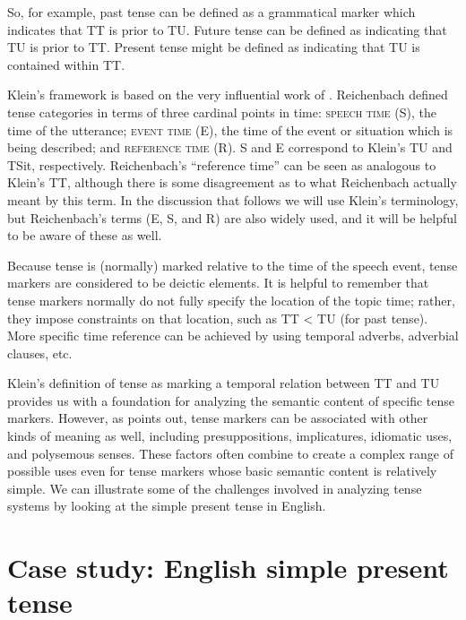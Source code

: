So, for example, past tense can be defined as a grammatical marker which indicates that TT is prior to TU. Future tense can be defined as indicating that TU is prior to TT. Present tense might be defined as indicating that TU is contained within TT.



Klein’s framework is based on the very influential work of \citet{Reichenbach1947}. Reichenbach defined tense categories in terms of three cardinal points in time: \textsc{speech time} (S), the time of the utterance; \textsc{event time} (E), the time of the event or situation which is being described; and \textsc{reference time} (R). S and E correspond to Klein’s TU and TSit, respectively. Reichenbach’s “reference time” can be seen as analogous to Klein’s TT, although there is some disagreement as to what Reichenbach actually meant by this term. In the discussion that follows we will use Klein’s terminology, but Reichenbach’s terms (E, S, and R) are also widely used, and it will be helpful to be aware of these as well.



Because tense is (normally) marked relative to the time of the speech event, tense markers are considered to be deictic elements. It is helpful to remember that tense markers normally do not fully specify the location of the topic time; rather, they impose constraints on that location, such as TT < TU (for past tense). More specific time reference can be achieved by using temporal adverbs, adverbial clauses, etc.



Klein’s definition of tense as marking a temporal relation between TT and TU provides us with a foundation for analyzing the semantic content of specific tense markers. However, as \citet[26--29, 54--55]{Comrie1985} points out, tense markers can be associated with other kinds of meaning as well, including presuppositions, implicatures, idiomatic uses, and polysemous senses. These factors often combine to create a complex range of possible uses even for tense markers whose basic semantic content is relatively simple. We can illustrate some of the challenges involved in analyzing tense systems by looking at the simple present tense in English.


\section{Case study: English simple present tense}\label{sec:21.3}

